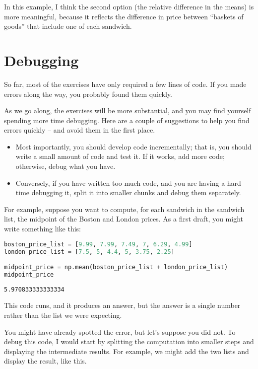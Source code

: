 In this example, I think the second option (the relative difference in
the means) is more meaningful, because it reflects the difference in
price between ``baskets of goods'' that include one of each sandwich.

\hypertarget{debugging}{%
\section{Debugging}\label{debugging}}

So far, most of the exercises have only required a few lines of code. If
you made errors along the way, you probably found them quickly.

As we go along, the exercises will be more substantial, and you may find
yourself spending more time debugging. Here are a couple of suggestions
to help you find errors quickly -- and avoid them in the first place.

\begin{itemize}
\item
  Most importantly, you should develop code incrementally; that is, you
  should write a small amount of code and test it. If it works, add more
  code; otherwise, debug what you have.
\item
  Conversely, if you have written too much code, and you are having a
  hard time debugging it, split it into smaller chunks and debug them
  separately.
\end{itemize}

For example, suppose you want to compute, for each sandwich in the
sandwich list, the midpoint of the Boston and London prices. As a first
draft, you might write something like this:

\begin{lstlisting}[language=Python]
boston_price_list = [9.99, 7.99, 7.49, 7, 6.29, 4.99]
london_price_list = [7.5, 5, 4.4, 5, 3.75, 2.25]

midpoint_price = np.mean(boston_price_list + london_price_list)
midpoint_price
\end{lstlisting}

\begin{lstlisting}[]
5.970833333333334
\end{lstlisting}

This code runs, and it produces an answer, but the answer is a single
number rather than the list we were expecting.

You might have already spotted the error, but let's suppose you did not.
To debug this code, I would start by splitting the computation into
smaller steps and displaying the intermediate results. For example, we
might add the two lists and display the result, like this.

